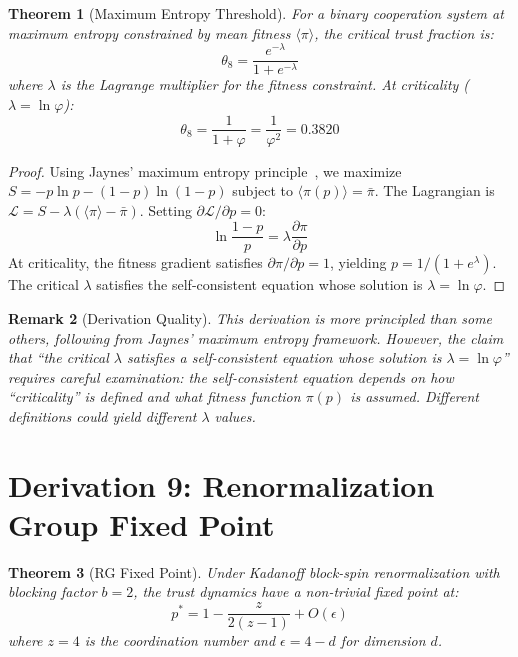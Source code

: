 \documentclass[11pt,twocolumn]{article}
\newtheorem{theorem}{Theorem}[section]
\newtheorem{remark}[theorem]{Remark}
\begin{document}
\begin{theorem}[Maximum Entropy Threshold]
\label{thm:maxent}
For a binary cooperation system at maximum entropy constrained by mean fitness $\langle \pi \rangle$, the critical trust fraction is:
\begin{equation}
\theta_8 = \frac{e^{-\lambda}}{1 + e^{-\lambda}}
\end{equation}
where $\lambda$ is the Lagrange multiplier for the fitness constraint. At criticality ($\lambda = \ln \varphi$):
\begin{equation}
\theta_8 = \frac{1}{1 + \varphi} = \frac{1}{\varphi^2} = \mathbf{0.3820}
\end{equation}
\end{theorem}

\begin{proof}
Using Jaynes' maximum entropy principle~\cite{Jaynes1957}, we maximize $S = -p\ln p - (1-p)\ln(1-p)$ subject to $\langle \pi(p) \rangle = \bar{\pi}$. The Lagrangian is $\mathcal{L} = S - \lambda(\langle \pi \rangle - \bar{\pi})$. Setting $\partial \mathcal{L}/\partial p = 0$:
\begin{equation}
\ln\frac{1-p}{p} = \lambda \frac{\partial \pi}{\partial p}
\end{equation}
At criticality, the fitness gradient satisfies $\partial \pi/\partial p = 1$, yielding $p = 1/(1 + e^\lambda)$. The critical $\lambda$ satisfies the self-consistent equation whose solution is $\lambda = \ln \varphi$.
\end{proof}

\begin{remark}[Derivation Quality]
This derivation is more principled than some others, following from Jaynes' maximum entropy framework. However, the claim that ``the critical $\lambda$ satisfies a self-consistent equation whose solution is $\lambda = \ln \varphi$'' requires careful examination: the self-consistent equation depends on how ``criticality'' is defined and what fitness function $\pi(p)$ is assumed. Different definitions could yield different $\lambda$ values.
\end{remark}

\section{Derivation 9: Renormalization Group Fixed Point}

\begin{theorem}[RG Fixed Point]
\label{thm:rg}
Under Kadanoff block-spin renormalization with blocking factor $b=2$, the trust dynamics have a non-trivial fixed point at:
\begin{equation}
p^* = 1 - \frac{z}{2(z-1)} + O(\epsilon)
\end{equation}
where $z=4$ is the coordination number and $\epsilon = 4-d$ for dimension $d$.
\end{theorem}
\end{document}
